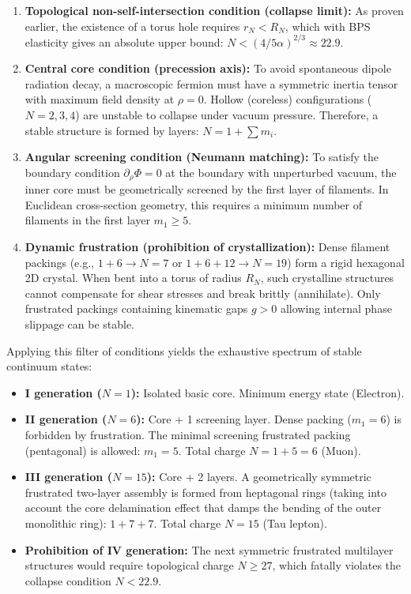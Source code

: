 \documentclass[11pt,a4paper]{article}
\begin{document}
\begin{enumerate}
\item \textbf{Topological non-self-intersection condition (collapse limit):} As proven earlier, the existence of a torus hole requires $r_N < R_N$, which with BPS elasticity gives an absolute upper bound: $N < (4 / 5\alpha)^{2/3} \approx 22.9$.

\item \textbf{Central core condition (precession axis):} To avoid spontaneous dipole radiation decay, a macroscopic fermion must have a symmetric inertia tensor with maximum field density at $\rho = 0$. Hollow (coreless) configurations ($N=2,3,4$) are unstable to collapse under vacuum pressure. Therefore, a stable structure is formed by layers: $N = 1 + \sum m_i$.

\item \textbf{Angular screening condition (Neumann matching):} To satisfy the boundary condition $\partial_\rho \Phi = 0$ at the boundary with unperturbed vacuum, the inner core must be geometrically screened by the first layer of filaments. In Euclidean cross-section geometry, this requires a minimum number of filaments in the first layer $m_1 \ge 5$.

\item \textbf{Dynamic frustration (prohibition of crystallization):} Dense filament packings (e.g., $1+6 \to N=7$ or $1+6+12 \to N=19$) form a rigid hexagonal 2D crystal. When bent into a torus of radius $R_N$, such crystalline structures cannot compensate for shear stresses and break brittly (annihilate). Only frustrated packings containing kinematic gaps $g > 0$ allowing internal phase slippage can be stable.
\end{enumerate}

Applying this filter of conditions yields the exhaustive spectrum of stable continuum states:
\begin{itemize}
\item \textbf{I generation ($N=1$):} Isolated basic core. Minimum energy state (Electron).
\item \textbf{II generation ($N=6$):} Core + 1 screening layer. Dense packing ($m_1=6$) is forbidden by frustration. The minimal screening frustrated packing (pentagonal) is allowed: $m_1 = 5$. Total charge $N = 1 + 5 = 6$ (Muon).
\item \textbf{III generation ($N=15$):} Core + 2 layers. A geometrically symmetric frustrated two-layer assembly is formed from heptagonal rings (taking into account the core delamination effect that damps the bending of the outer monolithic ring): $1 + 7 + 7$. Total charge $N = 15$ (Tau lepton).
\item \textbf{Prohibition of IV generation:} The next symmetric frustrated multilayer structures would require topological charge $N \ge 27$, which fatally violates the collapse condition $N < 22.9$.
\end{itemize}
\end{document}
